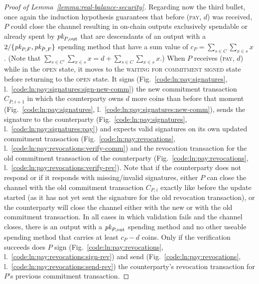\begin{proof}[Proof of Lemma~\ref{lemma:real-balance-security}]
  Regarding now the third bullet, once again the induction hypothesis guarantees
  that before (\textsc{pay}, $d$) was received, $P$ could close the channel
  resulting in on-chain outputs exclusively spendable or already spent by
  $\textit{pk}_{P, \mathrm{out}}$ that are descendants of an output with a  $2/\{\textit{pk}_{P,
  F}, \textit{pk}_{\bar{P}, F}\}$ spending method that have a sum value of $c_P =
  \sum\limits_{s \in C} \sum\limits_{x \in s} x$. (Note that $\sum\limits_{s \in
  C'} \sum\limits_{x \in s} x = d + \sum\limits_{s \in C} \sum\limits_{x \in s}
  x$.) When $P$ receives (\textsc{pay}, $d$) while in the \textsc{open} state,
  it moves to the \textsc{waiting for commitment signed} state before returning
  to the \textsc{open} state. It signs (Fig.~\ref{code:ln:pay:signatures},
  l.~\ref{code:ln:pay:signatures:sign-new-comm}) the new commitment transaction
  $C_{\bar{P}, i+1}$ in which the counterparty owns $d$ more coins than before
  that moment (Fig.~\ref{code:ln:pay:signatures},
  l.~\ref{code:ln:pay:signatures:new-comm}), sends the signature to the
  counterparty (Fig.~\ref{code:ln:pay:signatures},
  l.~\ref{code:ln:pay:signatures:pay}) and expects valid signatures on its own
  updated commitment transaction (Fig.~\ref{code:ln:pay:revocations},
  l.~\ref{code:ln:pay:revocations:verify-comm}) and the revocation transaction
  for the old commitment transaction of the counterparty
  (Fig.~\ref{code:ln:pay:revocations},
  l.~\ref{code:ln:pay:revocations:verify-rev}). Note that if the counterparty
  does not respond or if it responds with missing/invalid signatures, either $P$
  can close the channel with the old commitment transaction $C_{P, i}$ exactly
  like before the update started (as it has not yet sent the signature for the
  old revocation transaction), or the counterparty will close the channel either
  with the new or with the old commitment transaction. In all cases in which
  validation fails and the channel closes, there is an output with a $\textit{pk}_{P,
  \mathrm{out}}$ spending method and no other useable spending method that
  carries at least $c_P - d$ coins. Only if the verification succeeds does $P$
  sign (Fig.~\ref{code:ln:pay:revocations},
  l.~\ref{code:ln:pay:revocations:sign-rev}) and send
  (Fig.~\ref{code:ln:pay:revocations},
  l.~\ref{code:ln:pay:revocations:send-rev}) the counterparty's revocation
  transaction for $P$'s previous commitment transaction.


\end{proof}
